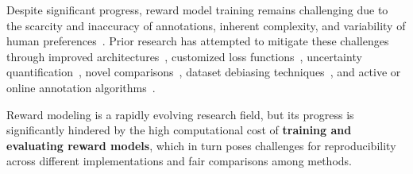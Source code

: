 
Despite significant progress, reward model training remains challenging due to the scarcity and inaccuracy of annotations, inherent complexity, and variability of human preferences~\citep{lambert2024rewardbench,wang2024secrets,gao2023scaling}. Prior research has attempted to mitigate these challenges through improved architectures~\citep{wang2024arithmetic, wang2024arithmetic}, customized loss functions~\citep{winata2024metametrics,liu2024skywork}, uncertainty quantification~\citep{lou2024uncertainty,coste2023reward,zhang2024overcoming}, novel comparisons~\citep{sun2024rethinking,yin2024relative}, dataset debiasing techniques~\citep{park2024offsetbias}, and active or online annotation algorithms~\citep{xiong2023gibbs,muldrew2024active,dong2024rlhf}.

Reward modeling is a rapidly evolving research field, but its progress is significantly hindered by the high computational cost of \textbf{training and evaluating reward models}, which in turn poses challenges for reproducibility across different implementations and fair comparisons among methods. 


